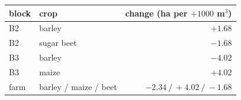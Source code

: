 \begin{center}\footnotesize
\begin{tabular}{llr}
\toprule
block & crop & change (ha per $+1000$ m$^3$)\\
\midrule
B2 & barley & $+1.68$\\
B2 & sugar beet & $-1.68$\\
B3 & barley & $-4.02$\\
B3 & maize & $+4.02$\\
\midrule
farm & barley / maize / beet & $-2.34\ /\ +4.02\ /\ -1.68$\\
\bottomrule
\end{tabular}
\end{center}
